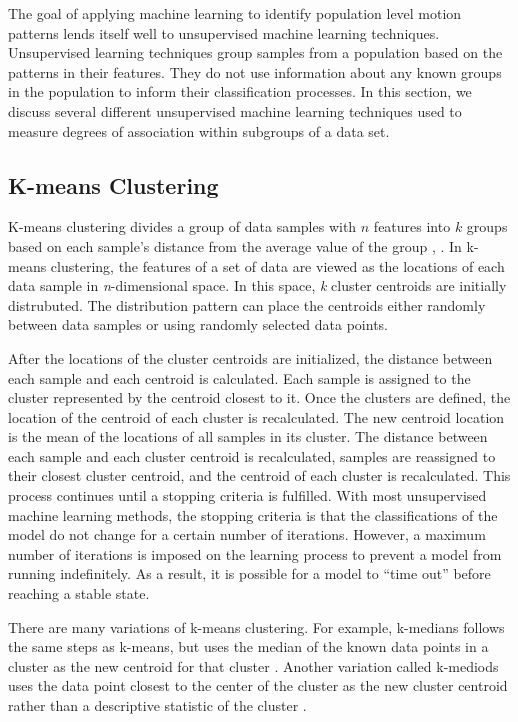 The goal of applying machine learning to identify population level motion patterns lends itself well to unsupervised machine learning techniques. Unsupervised learning techniques group samples from a population based on the patterns in their features. They do not use information about any known groups in the population to inform their classification processes. In this section, we discuss several different unsupervised machine learning techniques used to measure degrees of association within subgroups of a data set.

\subsection{K-means Clustering}

K-means clustering divides a group of data samples with $n$ features into $k$ groups based on each sample's distance from the average value of the group \cite{Hartigan1979}, \cite{macqueen1967}. In k-means clustering, the features of a set of data are viewed as the locations of each data sample in \textit{n}-dimensional space. In this space, \textit{k} cluster centroids are initially distrubuted. The distribution pattern can place the centroids either randomly between data samples or using randomly selected data points.

After the locations of the cluster centroids are initialized, the distance between each sample and each centroid is calculated. Each sample is assigned to the cluster represented by the centroid closest to it. Once the clusters are defined, the location of the centroid of each cluster is recalculated. The new centroid location is the mean of the locations of all samples in its cluster. The distance between each sample and each cluster centroid is recalculated, samples are reassigned to their closest cluster centroid, and the centroid of each cluster is recalculated. This process continues until a stopping criteria is fulfilled. With most unsupervised machine learning methods, the stopping criteria is that the classifications of the model do not change for a certain number of iterations. However, a maximum number of iterations is imposed on the learning process to prevent a model from running indefinitely. As a result, it is possible for a model to ``time out'' before reaching a stable state.

There are many variations of k-means clustering. For example, k-medians follows the same steps as k-means, but uses the median of the known data points in a cluster as the new centroid for that cluster \cite{Juan1998}. Another variation called k-mediods uses the data point closest to the center of the cluster as the new cluster centroid rather than a descriptive statistic of the cluster \cite{Kaufman1987}.

